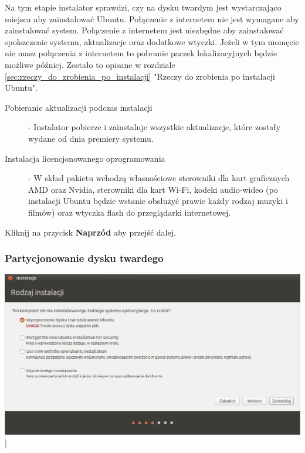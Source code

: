 Na tym etapie instalator sprawdzi, czy na dysku twardym jest wystarczająco miejsca aby zainstalować Ubuntu. Połączenie z internetem nie jest wymagane aby zainstalować system. Połączenie z internetem jest niezbędne aby zainstalować spolszczenie systemu, aktualizacje oraz dodatkowe wtyczki. Jeżeli w tym momęcie nie masz połączenia z internetem to pobranie paczek lokalizacyjnych będzie możliwe później. Zostało to opisane w rozdziale \ref{sec:rzeczy_do_zrobienia_po_instalacji} "Rzeczy do zrobienia po instalacji Ubuntu".
\begin{description}
\item[Pobieranie aktualizacji podczas instalacji] - Instalator pobierze i zainstaluje wszystkie aktualizacje, które zostały wydane od dnia premiery systemu.
\item[Instalacja licencjonowanego oprogramowania] - W skład pakietu wchodzą własnościowe sterowniki dla kart graficznych AMD oraz Nvidia, sterowniki dla kart Wi-Fi, kodeki audio-wideo (po instalacji Ubuntu będzie wstanie obsłużyć prawie każdy rodzaj muzyki i filmów) oraz wtyczka flash do przeglądarki internetowej.
\end{description}
\begin{flushright}
Kliknij na przycisk \textbf{Naprzód} aby przejść dalej.
\end{flushright}
\clearpage
\subsubsection{Partycjonowanie dysku twardego}
\begin{center}
        \includegraphics[scale=0.5]{images/instalator_partycjonowanie_proste.png}]
\end{center}

